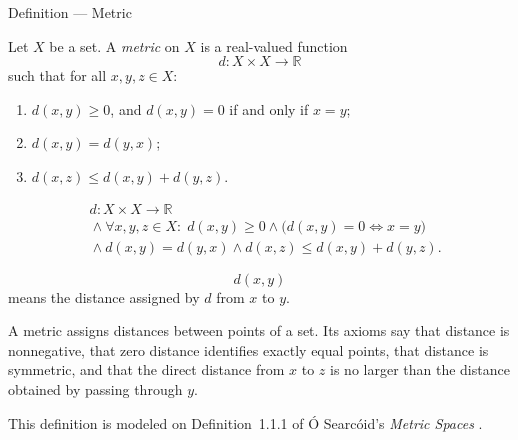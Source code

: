 \begin{definitionbox}{Definition --- Metric}
\begin{definition}[Metric]\label{def:metric-on-set}
Let \(X\) be a set.  A \emph{metric} on \(X\) is a real-valued function
\[
  d : X \times X \to \mathbb{R}
\]
such that for all \(x,y,z\in X\):
\begin{enumerate}
  \item \(d(x,y)\geq 0\), and \(d(x,y)=0\) if and only if \(x=y\);
  \item \(d(x,y)=d(y,x)\);
  \item \(d(x,z)\leq d(x,y)+d(y,z)\).
\end{enumerate}
\end{definition}
\end{definitionbox}

\begin{remark*}
\[
\begin{aligned}
&d:X\times X\to\mathbb{R}
\\
&{}\land
\forall x,y,z\in X{:}\;
d(x,y)\geq 0
\land
\bigl(d(x,y)=0\Longleftrightarrow x=y\bigr)
\\
&{}\land
d(x,y)=d(y,x)
\land
d(x,z)\leq d(x,y)+d(y,z).
\end{aligned}
\]
\end{remark*}

\begin{remark*}
\[
d(x,y)
\]
means the distance assigned by \(d\) from \(x\) to \(y\).
\end{remark*}

\begin{remark*}[Interpretation]
A metric assigns distances between points of a set.  Its axioms say that
distance is nonnegative, that zero distance identifies exactly equal points,
that distance is symmetric, and that the direct distance from \(x\) to \(z\)
is no larger than the distance obtained by passing through \(y\).
\end{remark*}

\begin{remark*}
This definition is modeled on Definition~1.1.1 of
{\'O} Searc{\'o}id's \emph{Metric Spaces} \cite{OSearcoidMetricSpaces}.
\end{remark*}


\DefinitionalRoot

